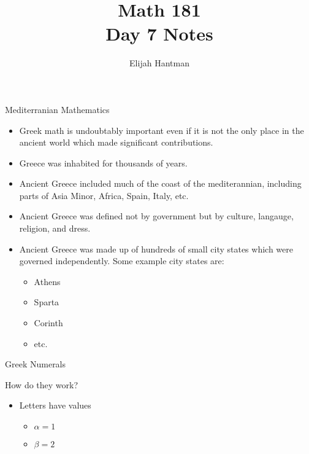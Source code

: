 \documentclass{report}
\title{\Huge{Math 181}\\Day 7 Notes}
\author{\huge{Elijah Hantman}}
\date{}
\begin{document}
\maketitle
\newpage

\begin{description}
    \item {\large Mediterranian Mathematics} 
        \begin{mdframed}
            \begin{itemize}
                \item Greek math is undoubtably important
                    even if it is not the only
                    place in the ancient world which made
                    significant contributions.
                \item Greece was inhabited for thousands of
                    years.
                \item Ancient Greece included much of the
                    coast of the mediterannian, including parts
                    of Asia Minor, Africa, Spain, Italy, etc.
                \item Ancient Greece was defined not by government
                    but by culture, langauge, religion, and dress.
                \item Ancient Greece was made up of hundreds of small
                    city states which were governed independently.
                    Some example city states are:
                    \begin{itemize}
                        \item Athens
                        \item Sparta
                        \item Corinth
                        \item etc.
                    \end{itemize}
            \end{itemize}
        \end{mdframed}
    \item {\large Greek Numerals}
        \begin{mdframed}
            How do they work? 
            \begin{itemize}
                \item Letters have values
                    \begin{itemize}
                        \item $\alpha = 1$
                        \item $\beta = 2$

\end{itemize}
\end{itemize}
\end{mdframed}
\end{description}
\end{document}
